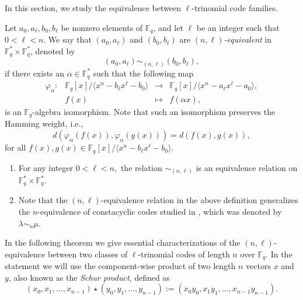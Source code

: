 \documentclass[12pt]{elsarticle}
\newcommand{\Fq}{\mathbb{F}_{q}}
\theoremstyle{break}
{\theorembodyfont{\upshape}
    \newtheorem{theorem}{Theorem}[section] %
    \newtheorem{lemma}[theorem]{Lemma} %
    \newtheorem{proposition}[theorem]{Proposition}
    \newtheorem{corollary}[theorem]{Corollary}
    \newtheorem{definition}[theorem]{Definition}
    \newtheorem{example}[theorem]{Example}
    \newtheorem{remark}[theorem]{Remark}
    \newtheorem{conjecture}[theorem]{Conjecture}
    \newtheorem*{proof}{{Proof}}
	\newtheorem*{notation}{Notation}
	\newtheorem*{main}{Cain Theorem}
	\newtheorem*{problem}{Problem}
}
\begin{document}
 In this section, we study the equivalence between $\ell$-trinomial code families.

 \begin{definition}\label{Def_Iso}
Let $a_0, a_{\ell}, b_0, b_{\ell}$ be nonzero elements of $\mathbb{F}_q$, and let $\ell$ be an integer such that $0 < \ell < n$. We say that $(a_0, a_{\ell})$ and $(b_0, b_{\ell})$ are \textit{$(n,\ell)$-equivalent} in $\mathbb{F}_q^* \times \mathbb{F}_q^*$, denoted by 
$$
(a_0, a_{\ell}) \sim_{(n,\ell)} (b_0, b_{\ell}),
$$
if there exists an $\alpha \in \mathbb{F}_q^*$ such that the following map
  \begin{equation}
  	\begin{array}{cccc}
  	\varphi_{\alpha}:& \mathbb{F}_q[x] /\langle x^n-b_{\ell}x^{\ell}-b_0 \rangle  &\longrightarrow & \mathbb{F}_q[x] /\langle x^n-a_{\ell} x^{\ell}-a_0 \rangle, \\ 
  	& f(x) & \longmapsto &  f(\alpha x),
  	\end{array}
  	\end{equation} 
is an $\Fq$-algebra isomorphism. Note that such an isomorphism preserves the Hamming weight, i.e., 
$$
d(\varphi_{\alpha}(f(x)), \varphi_{\alpha}(g(x)))=d(f(x), g(x)),$$
for all  $f(x), g(x) \in \Fq[x] /\langle x^n-b_{\ell}x^{\ell}-b_0 \rangle.$
\end{definition}

\begin{remark}\label{Remark.3}
\begin{enumerate}
    \item  For any  integer  $0<\ell<n,$ the relation $\sim_{(n,\ell)}$ is an equivalence relation on $\Fq^*\times \Fq^*.$
 \item  Note that the $(n,\ell)$-equivalence relation in the above definition generalizes the $n$-equivalence of constacyclic codes studied in \cite[Definition 3.1]{Chen2014}, which was denoted by $\lambda \sim_n \mu$.

\end{enumerate}
\end{remark}


In the following theorem we give essential characterizations of the $(n,\ell)$-equivalence  between two classes of $\ell$-trinomial codes of length $n$ over $\mathbb{F}_q$. In the statement we will use the component-wise product of two length $n$ vectors $x$ and $y$, also known as the \textit{Schur product},  defined as
$$
(x_0, x_1, \ldots, x_{n-1}) \star (y_0, y_1, \ldots, y_{n-1}):=(x_0 y_0, x_1 y_1, \ldots, x_{n-1} y_{n-1}) .
$$
\end{document}
